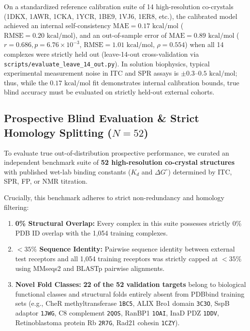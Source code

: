 \documentclass[10pt,twocolumn]{article}
\begin{document}
On a standardized reference calibration suite of 14 high-resolution co-crystals (1DKX, 1AWR, 1CKA, 1YCR, 1BE9, 1VJ6, 1ER8, etc.), the calibrated model achieved an internal self-consistency $\text{MAE} = 0.17\text{ kcal/mol}$ ($\text{RMSE} = 0.20\text{ kcal/mol}$), and an out-of-sample error of $\text{MAE} = 0.89\text{ kcal/mol}$ ($r = 0.686, p = 6.76 \times 10^{-3}$, $\text{RMSE} = 1.01\text{ kcal/mol}$, $\rho = 0.554$) when all 14 complexes were strictly held out (leave-14-out cross-validation via \texttt{scripts/evaluate\_leave\_14\_out.py}). In solution biophysics, typical experimental measurement noise in ITC and SPR assays is $\pm 0.3$--$0.5\text{ kcal/mol}$; thus, while the $0.17\text{ kcal/mol}$ fit demonstrates internal calibration bounds, true blind accuracy must be evaluated on strictly held-out external cohorts.

\subsection{Prospective Blind Evaluation \& Strict Homology Splitting ($N=52$)}
To evaluate true out-of-distribution prospective performance, we curated an independent benchmark suite of \textbf{52 high-resolution co-crystal structures} with published wet-lab binding constants ($K_d$ and $\Delta G^\circ$) determined by ITC, SPR, FP, or NMR titration. 

Crucially, this benchmark adheres to strict non-redundancy and homology filtering:
\begin{enumerate}
    \item \textbf{0\% Structural Overlap:} Every complex in this suite possesses strictly 0\% PDB ID overlap with the 1,054 training complexes.
    \item \textbf{$<35\%$ Sequence Identity:} Pairwise sequence identity between external test receptors and all 1,054 training receptors was strictly capped at \textbf{$<35\%$} using MMseqs2 and BLASTp pairwise alignments.
    \item \textbf{Novel Fold Classes:} \textbf{22 of the 52 validation targets} belong to biological functional classes and structural folds entirely absent from PDBbind training sets (e.g., CheR methyltransferase \texttt{1BC5}, ALIX Bro1 domain \texttt{3C3O}, SspB adaptor \texttt{1JWG}, C8 complement \texttt{2QOS}, RanBP1 \texttt{1OAI}, InaD PDZ \texttt{1DDV}, Retinoblastoma protein Rb \texttt{2R7G}, Rad21 cohesin \texttt{1CZY}).
\end{enumerate}
\end{document}
